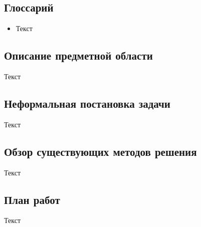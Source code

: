 \documentclass[../document.tex]{subfiles}
\begin{document}
\subsection{Глоссарий}
\begin{itemize}
    \item Текст
\end{itemize}
\subsection{Описание предметной области}
\par Текст
\subsection{Неформальная постановка задачи}
\par Текст
\subsection{Обзор существующих методов решения}
\par Текст
\subsection{План работ}
\par Текст
\end{document}
